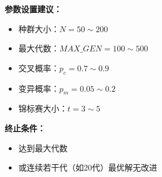 \documentclass[UTF8,12pt,a4paper]{ctexart}
\begin{document}
\textbf{参数设置建议：}
\begin{itemize}
	\item 种群大小：$N = 50 \sim 200$
	\item 最大代数：$MAX\_GEN = 100 \sim 500$
	\item 交叉概率：$p_c = 0.7 \sim 0.9$
	\item 变异概率：$p_m = 0.05 \sim 0.2$
	\item 锦标赛大小：$t = 3 \sim 5$
\end{itemize}

\textbf{终止条件：}
\begin{itemize}
	\item 达到最大代数
	\item 或连续若干代（如20代）最优解无改进
\end{itemize}
\end{document}
